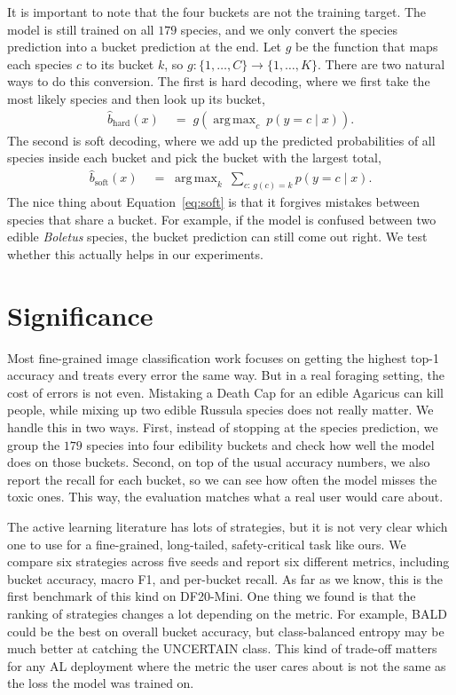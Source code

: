 \documentclass[11pt]{article}
\DeclareMathOperator*{\argmax}{arg\,max}
\begin{document}
It is important to note that the four buckets are not the training target.
The model is still trained on all $179$ species, and we only convert the
species prediction into a bucket prediction at the end. Let $g$ be the
function that maps each species $c$ to its bucket $k$, so
$g:\{1,\ldots,C\}\to\{1,\ldots,K\}$. There are two natural ways to do this
conversion. The first is hard decoding, where we first take the most likely
species and then look up its bucket,
\begin{align}
\hat b_{\text{hard}}(x) &\;=\; g\!\left(\argmax_{c}\ p(y=c\mid x)\right).
\label{eq:hard}
\end{align}
The second is soft decoding, where we add up the predicted probabilities of
all species inside each bucket and pick the bucket with the largest total,
\begin{align}
\hat b_{\text{soft}}(x) &\;=\; \argmax_{k}\ \sum_{c:\,g(c)=k} p(y=c\mid x).
\label{eq:soft}
\end{align}
The nice thing about Equation~\eqref{eq:soft} is that it forgives mistakes
between species that share a bucket. For example, if the model is confused
between two edible \emph{Boletus} species, the bucket prediction can still
come out right. We test whether this actually helps in our experiments.
\section{Significance}

Most fine-grained image classification work focuses on getting the highest
top-1 accuracy and treats every error the same way. But in a real foraging
setting, the cost of errors is not even. Mistaking a Death Cap for an
edible Agaricus can kill people, while mixing up two edible
Russula species does not really matter. We handle this in two ways. First, instead of stopping at the species prediction, we group the $179$ species into four edibility buckets and check how well the model does on those buckets. Second, on top of the usual
accuracy numbers, we also report the recall for each bucket, so we can see
how often the model misses the toxic ones. This way, the evaluation matches
what a real user would care about. 

The active learning literature has lots of strategies, but it is not very
clear which one to use for a fine-grained, long-tailed, safety-critical task
like ours. We compare six strategies across five seeds and report six
different metrics, including bucket accuracy, macro F1, and per-bucket
recall. As far as we know, this is the first benchmark of this kind on
DF20-Mini. One thing we found is that the ranking of strategies changes a
lot depending on the metric. For example, BALD could be the best on overall bucket accuracy,
but class-balanced entropy may be much better at catching the UNCERTAIN class.
This kind of trade-off matters for any AL deployment where the metric the
user cares about is not the same as the loss the model was trained on.
\end{document}
